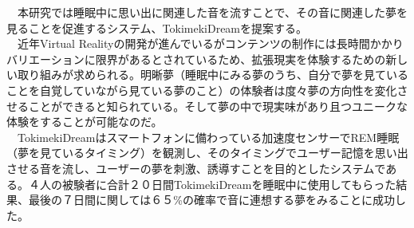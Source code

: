 
\begin{jabstract}
　本研究では睡眠中に思い出に関連した音を流すことで、その音に関連した夢を見ることを促進するシステム、TokimekiDreamを提案する。\\
　近年Virtual Realityの開発が進んでいるがコンテンツの制作には長時間かかりバリエーションに限界があるとされているため、拡張現実を体験するための新しい取り組みが求められる。明晰夢（睡眠中にみる夢のうち、自分で夢を見ていることを自覚していながら見ている夢のこと）の体験者は度々夢の方向性を変化させることができると知られている。そして夢の中で現実味があり且つユニークな体験をすることが可能なのだ。\\
　TokimekiDreamはスマートフォンに備わっている加速度センサーでREM睡眠（夢を見ているタイミング）を観測し、そのタイミングでユーザー記憶を思い出させる音を流し、ユーザーの夢を刺激、誘導すことを目的としたシステムである。４人の被験者に合計２０日間TokimekiDreamを睡眠中に使用してもらった結果、最後の７日間に関しては６５\%の確率で音に連想する夢をみることに成功した。
\end{jabstract}


